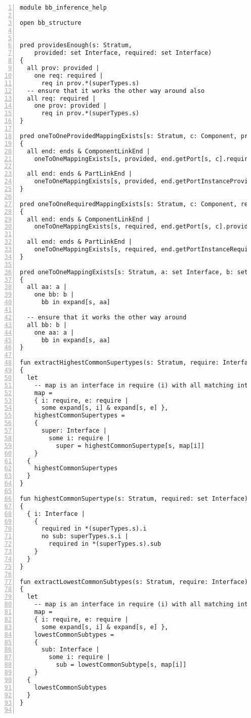 \lstset{frame=tb, aboveskip=12pt, belowskip=-3pt, breaklines=true, tabsize=2, mathescape=true}
\begin{lstlisting}[caption={bb\_inference\_help.als}, numbers=left]
module bb_inference_help

open bb_structure


pred providesEnough(s: Stratum,
    provided: set Interface, required: set Interface)
{
  all prov: provided |
    one req: required |
      req in prov.*(superTypes.s)
  -- ensure that it works the other way around also
  all req: required |
    one prov: provided |
      req in prov.*(superTypes.s)
}

pred oneToOneProvidedMappingExists[s: Stratum, c: Component, provided: set Interface, ends: LinkEnd]
{
  all end: ends & ComponentLinkEnd |
    oneToOneMappingExists[s, provided, end.getPort[s, c].required.c.s]

  all end: ends & PartLinkEnd |
    oneToOneMappingExists[s, provided, end.getPortInstanceProvided[s, c]]
}

pred oneToOneRequiredMappingExists[s: Stratum, c: Component, required: set Interface, ends: LinkEnd]
{
  all end: ends & ComponentLinkEnd |
    oneToOneMappingExists[s, required, end.getPort[s, c].provided.c.s]

  all end: ends & PartLinkEnd |
    oneToOneMappingExists[s, required, end.getPortInstanceRequired[s, c]]
}

pred oneToOneMappingExists[s: Stratum, a: set Interface, b: set Interface]
{
  all aa: a |
    one bb: b |
      bb in expand[s, aa]
      
  -- ensure that it works the other way around
  all bb: b |
    one aa: a |
      bb in expand[s, aa]
}

fun extractHighestCommonSupertypes(s: Stratum, require: Interface): set Interface
{
  let
    -- map is an interface in require (i) with all matching interfaces in require (e)
    map =
    { i: require, e: require |
      some expand[s, i] & expand[s, e] },
    highestCommonSupertypes =
    {
      super: Interface |
        some i: require |
          super = highestCommonSupertype[s, map[i]]
    }
  {
    highestCommonSupertypes
  }
}

fun highestCommonSupertype(s: Stratum, required: set Interface): lone Interface
{
  { i: Interface |
    {
      required in *(superTypes.s).i
      no sub: superTypes.s.i |
        required in *(superTypes.s).sub
    }
  }
}

fun extractLowestCommonSubtypes(s: Stratum, require: Interface): set Interface
{
  let
    -- map is an interface in require (i) with all matching interfaces in require (e)
    map =
    { i: require, e: require |
      some expand[s, i] & expand[s, e] },
    lowestCommonSubtypes =
    {
      sub: Interface |
        some i: require |
          sub = lowestCommonSubtype[s, map[i]]
    }
  {
    lowestCommonSubtypes
  }
}


\end{lstlisting}

